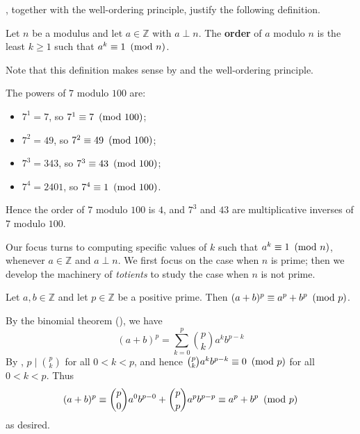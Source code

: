, together with the well-ordering principle, justify the following definition.

\begin{definition}
\label{defOrderModularArithmetic}
Let $n$ be a modulus and let $a \in \mathbb{Z}$ with $a \perp n$. The \textbf{order} of $a$ modulo $n$ is the least $k \ge 1$ such that $a^k \equiv 1 ~\left(\text{mod}~n\right)$.
\end{definition}

Note that this definition makes sense by  and the well-ordering principle.

\begin{example}
The powers of $7$ modulo $100$ are:
\begin{itemize}
\item $7^1 = 7$, so $7^1 \equiv 7 ~\left(\text{mod}~100\right)$;
\item $7^2 = 49$, so $7^2 \equiv 49 ~\left(\text{mod}~100\right)$;
\item $7^3 = 343$, so $7^3 \equiv 43 ~\left(\text{mod}~100\right)$;
\item $7^4 = 2401$, so $7^4 \equiv 1 ~\left(\text{mod}~100\right)$.
\end{itemize}
Hence the order of $7$ modulo $100$ is $4$, and $7^3$ and $43$ are multiplicative inverses of $7$ modulo $100$.
\end{example}

Our focus turns to computing specific values of $k$ such that $a^k \equiv 1 ~\left(\text{mod}~n\right)$, whenever $a \in \mathbb{Z}$ and $a \perp n$. We first focus on the case when $n$ is prime; then we develop the machinery of \textit{totients} to study the case when $n$ is not prime.

\begin{lemma} \label{lemBinomPrimeExponent}
Let $a,b \in \mathbb{Z}$ and let $p \in \mathbb{Z}$ be a positive prime. Then $(a+b)^p \equiv a^p+b^p ~\left(\text{mod}~p\right)$.
\end{lemma}
\begin{cproof}
By the binomial theorem (), we have
\[ (a+b)^p = \sum_{k=0}^p \binom{p}{k} a^kb^{p-k} \]
By , $p \mid \binom{p}{k}$ for all $0 < k < p$, and hence $\binom{p}{k} a^k b^{p-k} \equiv 0 ~\left(\text{mod}~p\right)$ for all $0 < k < p$. Thus
\[ (a+b)^p \equiv \binom{p}{0}a^0b^{p-0} + \binom{p}{p}a^pb^{p-p} \equiv a^p+b^p ~\left(\text{mod}~p\right) \]
as desired.
\end{cproof}

